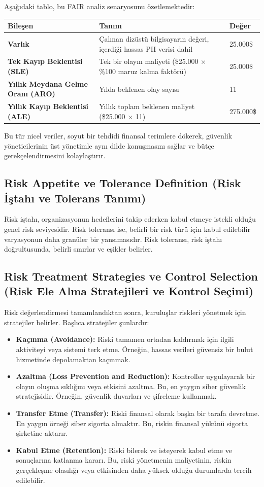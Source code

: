Aşağıdaki tablo, bu FAIR analiz senaryosunu özetlemektedir:

\begin{tabular}{|l|l|l|}
\hline
Bileşen & Tanım & Değer \\
\hline
\textbf{Varlık} & Çalınan dizüstü bilgisayarın değeri, içerdiği hassas PII verisi dahil & 25.000\$ \\
\hline
\textbf{Tek Kayıp Beklentisi (SLE)} & Tek bir olayın maliyeti (\$25.000 $\times$ \%100 maruz kalma faktörü) & 25.000\$ \\
\hline
\textbf{Yıllık Meydana Gelme Oranı (ARO)} & Yılda beklenen olay sayısı & 11 \\
\hline
\textbf{Yıllık Kayıp Beklentisi (ALE)} & Yıllık toplam beklenen maliyet (\$25.000 $\times$ 11) & 275.000\$ \\
\hline
\end{tabular}

Bu tür nicel veriler, soyut bir tehdidi finansal terimlere dökerek, güvenlik yöneticilerinin üst yönetimle aynı dilde konuşmasını sağlar ve bütçe gerekçelendirmesini kolaylaştırır.

\subsection{Risk Appetite ve Tolerance Definition (Risk İştahı ve Tolerans Tanımı)}

Risk iştahı, organizasyonun hedeflerini takip ederken kabul etmeye istekli olduğu genel risk seviyesidir. Risk toleransı ise, belirli bir risk türü için kabul edilebilir varyasyonun daha granüler bir yansımasıdır. Risk toleransı, risk iştahı doğrultusunda, belirli sınırlar ve eşikler belirler.

\subsection{Risk Treatment Strategies ve Control Selection (Risk Ele Alma Stratejileri ve Kontrol Seçimi)}

Risk değerlendirmesi tamamlandıktan sonra, kuruluşlar riskleri yönetmek için stratejiler belirler. Başlıca stratejiler şunlardır:
\begin{itemize}
    \item \textbf{Kaçınma (Avoidance):} Riski tamamen ortadan kaldırmak için ilgili aktiviteyi veya sistemi terk etme. Örneğin, hassas verileri güvensiz bir bulut hizmetinde depolamaktan kaçınmak.
    \item \textbf{Azaltma (Loss Prevention and Reduction):} Kontroller uygulayarak bir olayın oluşma sıklığını veya etkisini azaltma. Bu, en yaygın siber güvenlik stratejisidir. Örneğin, güvenlik duvarları ve şifreleme kullanmak.
    \item \textbf{Transfer Etme (Transfer):} Riski finansal olarak başka bir tarafa devretme. En yaygın örneği siber sigorta almaktır. Bu, riskin finansal yükünü sigorta şirketine aktarır.
    \item \textbf{Kabul Etme (Retention):} Riski bilerek ve isteyerek kabul etme ve sonuçlarına katlanma kararı. Bu, riski yönetmenin maliyetinin, riskin gerçekleşme olasılığı veya etkisinden daha yüksek olduğu durumlarda tercih edilebilir.
\end{itemize}

